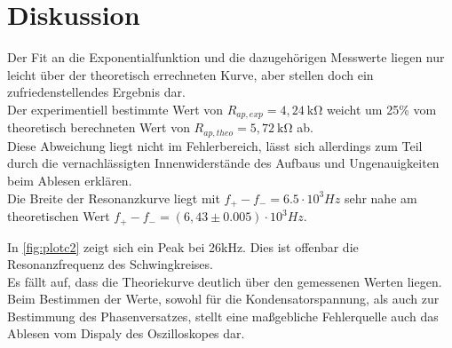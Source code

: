 \section{Diskussion}
\label{sec:Diskussion}


Der Fit an die Exponentialfunktion und die dazugehörigen Messwerte liegen nur leicht über der theoretisch 
errechneten Kurve, aber stellen doch ein zufriedenstellendes Ergebnis dar. \\




Der experimentiell bestimmte Wert von $R_{ap,exp} = 4,24 \: \mathrm{k\Omega}$ weicht um 25\% vom theoretisch berechneten Wert von 
$R_{ap,theo} = 5,72 \: \mathrm{k\Omega}$ ab. \\
Diese Abweichung liegt nicht im Fehlerbereich, lässt sich allerdings zum Teil durch die vernachlässigten Innenwiderstände des Aufbaus und Ungenauigkeiten 
beim Ablesen erklären.\\


Die Breite der Resonanzkurve liegt mit $f_+ - f_- = 6.5 \cdot 10^3 Hz$ sehr nahe am theoretischen Wert $f_+ - f_- = (6,43 \pm 0.005) \cdot 10^3 Hz$. 

In \autoref{fig:plotc2} zeigt sich ein Peak bei 26kHz. Dies ist offenbar die Resonanzfrequenz
des Schwingkreises. \\
Es fällt auf, dass die Theoriekurve deutlich über den gemessenen Werten liegen.\\ %

Beim Bestimmen der Werte, sowohl für die Kondensatorspannung, als auch zur Bestimmung des Phasenversatzes, stellt eine 
maßgebliche Fehlerquelle auch das Ablesen vom Dispaly des Oszilloskopes dar.\\ 


